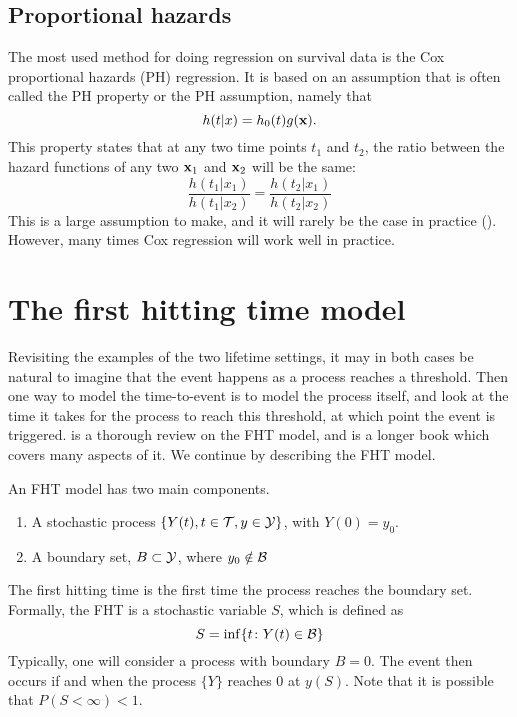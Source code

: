 \subsection{Proportional hazards}
The most used method for doing regression on survival data is the Cox proportional hazards (PH) regression. It is based on an assumption that is often called the PH property or the PH assumption, namely that
\begin{equation}
    h(t|x)=h_0(t)g(\mathbf{x}).
\end{equation}
This property states that at any two time points $t_1$ and $t_2$, the ratio between the hazard functions of any two $\mathbf{x}_1$ and $\mathbf{x}_2$ will be the same:
\begin{equation}
    \frac{h(t_1|x_1)}{h(t_1|x_2)}=\frac{h(t_2|x_1)}{h(t_2|x_2)}
\end{equation}
This is a large assumption to make, and it will rarely be the case in practice (\cite{lee2010}). However, many times Cox regression will work well in practice.

\section{The first hitting time model}\label{sec:fht}
Revisiting the examples of the two lifetime settings, it may in both cases be natural to imagine that the event happens as a process reaches a threshold. Then one way to model the time-to-event is to model the process itself, and look at the time it takes for the process to reach this threshold, at which point the event is triggered. \cite{lee2006} is a thorough review on the FHT model, and \cite{caroni2017} is a longer book which covers many aspects of it. We continue by describing the FHT model.

An FHT model has two main components.
\begin{enumerate}
    \item A stochastic process $\{Y(t), t\in\mathcal{T},y\in\mathcal{Y}\}$, with $Y(0)=y_0$.
    \item A boundary set, $B\subset \mathcal{Y}$, where $y_0\notin\mathcal{B}$
\end{enumerate}
The first hitting time is the first time the process reaches the boundary set. Formally, the FHT is a stochastic variable $S$, which is defined as
\[
    S = \inf\{t\colon Y(t)\in\mathcal{B}\}
\]
Typically, one will consider a process with boundary $B=0$. The event then occurs if and when the process $\{Y\}$ reaches 0 at $y(S)$. Note that it is possible that $P(S<\infty)<1$.

